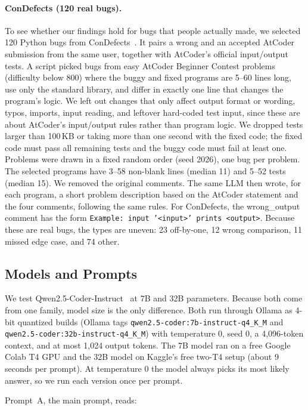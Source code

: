 \documentclass[sigconf,nonacm]{acmart}
\newcommand{\wo}{\textsf{wrong\_output}}
\newcommand{\cd}{ConDefects}
\begin{document}
\paragraph{\cd{} (120 real bugs).}
To see whether our findings hold for bugs that people actually made, we selected 120 Python bugs from \cd{}~\cite{wu2024condefects}. It pairs a wrong and an accepted AtCoder submission from the same user, together with AtCoder's official input/output tests. A script picked bugs from easy AtCoder Beginner Contest problems (difficulty below 800) where the buggy and fixed programs are 5--60 lines long, use only the standard library, and differ in exactly one line that changes the program's logic. We left out changes that only affect output format or wording, typos, imports, input reading, and leftover hard-coded test input, since these are about AtCoder's input/output rules rather than program logic. We dropped tests larger than 100\,KB or taking more than one second with the fixed code; the fixed code must pass all remaining tests and the buggy code must fail at least one. Problems were drawn in a fixed random order (seed 2026), one bug per problem. The selected programs have 3--58 non-blank lines (median 11) and 5--52 tests (median 15). We removed the original comments. The same LLM then wrote, for each program, a short problem description based on the AtCoder statement and the four comments, following the same rules. For \cd{}, the \wo{} comment has the form \texttt{Example: input '<input>' prints <output>}. Because these are real bugs, the types are uneven: 23 off-by-one, 12 wrong comparison, 11 missed edge case, and 74 other.

\subsection{Models and Prompts}
We test Qwen2.5-Coder-Instruct~\cite{hui2024qwen25coder} at 7B and 32B parameters. Because both come from one family, model size is the only difference. Both run through Ollama as 4-bit quantized builds (Ollama tags \nolinkurl{qwen2.5-coder:7b-instruct-q4_K_M} and \nolinkurl{qwen2.5-coder:32b-instruct-q4_K_M}) with temperature 0, seed 0, a 4,096-token context, and at most 1,024 output tokens. The 7B model ran on a free Google Colab T4 GPU and the 32B model on Kaggle's free two-T4 setup (about 9 seconds per prompt). At temperature 0 the model always picks its most likely answer, so we run each version once per prompt.

Prompt~A, the main prompt, reads:
\end{document}
